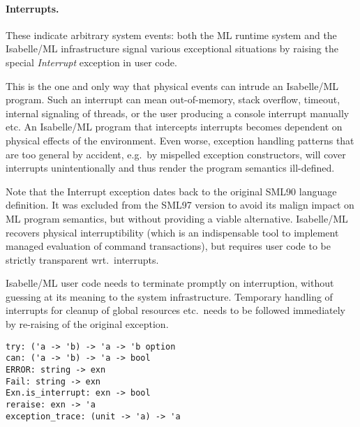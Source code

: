 \begin{isabellebody}
\begin{isamarkuptext}
  \paragraph{Interrupts.}  These indicate arbitrary system events:
  both the ML runtime system and the Isabelle/ML infrastructure signal
  various exceptional situations by raising the special
  \emph{Interrupt} exception in user code.

  This is the one and only way that physical events can intrude an
  Isabelle/ML program.  Such an interrupt can mean out-of-memory,
  stack overflow, timeout, internal signaling of threads, or the user
  producing a console interrupt manually etc.  An Isabelle/ML program
  that intercepts interrupts becomes dependent on physical effects of
  the environment.  Even worse, exception handling patterns that are
  too general by accident, e.g.\ by mispelled exception constructors,
  will cover interrupts unintentionally and thus render the program
  semantics ill-defined.

  Note that the Interrupt exception dates back to the original SML90
  language definition.  It was excluded from the SML97 version to
  avoid its malign impact on ML program semantics, but without
  providing a viable alternative.  Isabelle/ML recovers physical
  interruptibility (which is an indispensable tool to implement
  managed evaluation of command transactions), but requires user code
  to be strictly transparent wrt.\ interrupts.

  \begin{warn}
  Isabelle/ML user code needs to terminate promptly on interruption,
  without guessing at its meaning to the system infrastructure.
  Temporary handling of interrupts for cleanup of global resources
  etc.\ needs to be followed immediately by re-raising of the original
  exception.
  \end{warn}%
\end{isamarkuptext}%
\isamarkuptrue%
%
\isadelimmlref
%
\endisadelimmlref
%
\isatagmlref
%
\begin{isamarkuptext}%
\begin{mldecls}
  \verb|try: ('a -> 'b) -> 'a -> 'b option| \\
  \verb|can: ('a -> 'b) -> 'a -> bool| \\
  \verb|ERROR: string -> exn| \\
  \verb|Fail: string -> exn| \\
  \verb|Exn.is_interrupt: exn -> bool| \\
  \verb|reraise: exn -> 'a| \\
  \verb|exception_trace: (unit -> 'a) -> 'a| \\
  \end{mldecls}


\end{isamarkuptext}
\end{isabellebody}
